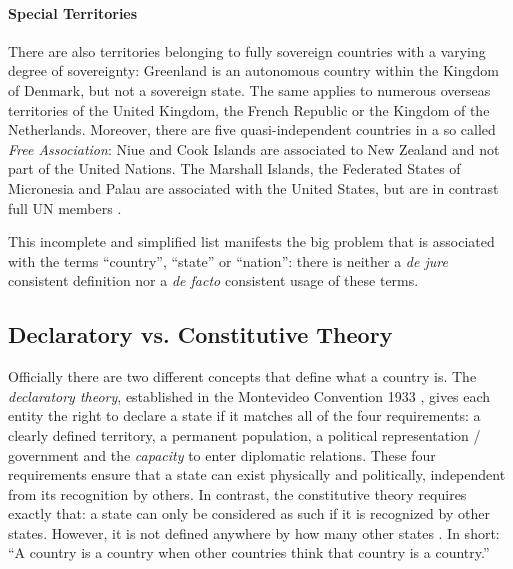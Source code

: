 \paragraph{Special Territories} %
\label{par:special_territories}

There are also territories belonging to fully sovereign countries with a varying degree of sovereignty: Greenland is an autonomous country within the Kingdom of Denmark, but not a sovereign state. The same applies to numerous overseas territories of the United Kingdom, the French Republic or the Kingdom of the Netherlands. Moreover, there are five quasi-independent countries in a so called \emph{Free Association}: Niue and Cook Islands are associated to New Zealand and not part of the United Nations. The Marshall Islands, the Federated States of Micronesia and Palau are associated with the United States, but are in contrast full UN members \cite{SpecialTerritories}.


This incomplete and simplified list manifests the big problem that is associated with the terms ``country'', ``state'' or ``nation'': there is neither a \emph{de jure} consistent definition nor a \emph{de facto} consistent usage of these terms.


\subsection{Declaratory vs. Constitutive Theory} %
\label{sub:declaratory_vs_constitutive_theory}

Officially there are two different concepts that define what a country is. The \emph{declaratory theory}, established in the Montevideo Convention 1933 \cite{MontevideoConvention}, gives each entity the right to declare a state if it matches all of the four requirements: a clearly defined territory, a permanent population, a political representation / government and the \emph{capacity} to enter diplomatic relations. These four requirements ensure that a state can exist physically and politically, independent from its recognition by others.
In contrast, the constitutive theory requires exactly that: a state can only be considered as such if it is recognized by other states. However, it is not defined anywhere by how many other states \cite{StateTheory}. In short: ``A country is a country when other countries think that country is a country.'' \cite{greyCountries}

